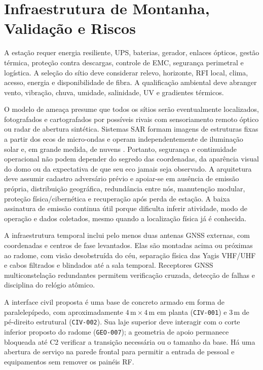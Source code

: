 \chapter{Infraestrutura de Montanha, Validação e Riscos}

A estação requer energia resiliente, UPS, baterias, gerador, enlaces ópticos, gestão térmica, proteção contra descargas, controle de EMC, segurança perimetral e logística. A seleção do sítio deve considerar relevo, horizonte, RFI local, clima, acesso, energia e disponibilidade de fibra. A qualificação ambiental deve abranger vento, vibração, chuva, umidade, salinidade, UV e gradientes térmicos.

O modelo de ameaça presume que todos os sítios serão eventualmente localizados, fotografados e cartografados por possíveis rivais com sensoriamento remoto óptico ou radar de abertura sintética. Sistemas SAR formam imagens de estruturas fixas a partir dos ecos de micro-ondas e operam independentemente de iluminação solar e, em grande medida, de nuvens \cite{esa_sar_intro}. Portanto, segurança e continuidade operacional não podem depender do segredo das coordenadas, da aparência visual do domo ou da expectativa de que seu eco jamais seja observado. A arquitetura deve assumir cadastro adversário prévio e apoiar-se em ausência de emissão própria, distribuição geográfica, redundância entre nós, manutenção modular, proteção física/cibernética e recuperação após perda de estação. A baixa assinatura de emissão continua útil porque dificulta inferir atividade, modo de operação e dados coletados, mesmo quando a localização física já é conhecida.

A infraestrutura temporal inclui pelo menos duas antenas GNSS externas, com coordenadas e centros de fase levantados. Elas são montadas acima ou próximas ao radome, com visão desobstruída do céu, separação física das Yagis VHF/UHF e cabos filtrados e blindados até a sala temporal. Receptores GNSS multiconstelação redundantes permitem verificação cruzada, detecção de falhas e disciplina do relógio atômico.

A interface civil proposta é uma base de concreto armado em forma de paralelepípedo, com aproximadamente $4\,\mathrm{m}\times4\,\mathrm{m}$ em planta (\texttt{CIV-001}) e $3\,\mathrm{m}$ de pé-direito estrutural (\texttt{CIV-002}). Sua laje superior deve interagir com o corte inferior proposto do radome (\texttt{GEO-007}); a geometria de apoio permanece bloqueada até C2 verificar a transição necessária ou o tamanho da base. Há uma abertura de serviço na parede frontal para permitir a entrada de pessoal e equipamentos sem remover os painéis RF.

